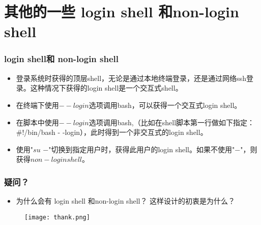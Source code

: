 \documentclass[notheorems,mathserif,table,compress,10pt]{beamer}  %
\begin{document}
\section{其他的一些 login shell 和non-login shell}
\begin{frame}
\frametitle{login shell和 non-login shell}
\begin{itemize}
\item 登录系统时获得的顶层shell，无论是通过本地终端登录，还是通过网络ssh登录。这种情况下获得的login shell是一个交互式shell。
\item  在终端下使用$--$$login$选项调用bash，可以获得一个交互式login shell。
\item  在脚本中使用$--$$login$选项调用bash,（比如在shell脚本第一行做如下指定：\#!/bin/bash - -login），此时得到一个非交互式的login shell。
\item 使用"$su$ $-$"切换到指定用户时，获得此用户的login shell。如果不使用"$-$"，则获得$non-login shell$。 
\end{itemize}
\end{frame}  

\begin{frame}
\frametitle{疑问？}
\begin{itemize}
\item 为什么会有 login shell 和non-login shell？ 这样设计的初衷是为什么？
\end{itemize}
\end{frame}  

\begin{frame}
\begin{figure}\centering 
  \begin{minipage}[t]{0.7\linewidth} 
    \texttt{[image: thank.png]}
  \end{minipage}
\end{figure} 
\end{frame}
\end{document}
